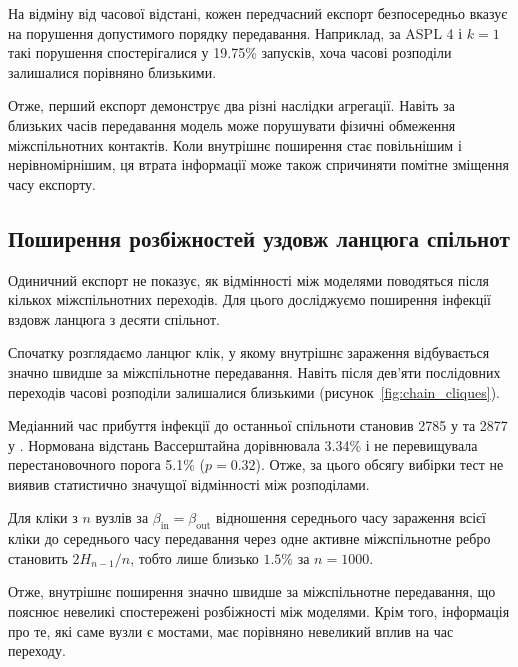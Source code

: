 На відміну від часової відстані,
кожен передчасний експорт безпосередньо
вказує на порушення допустимого порядку
передавання. Наприклад, за ASPL 4
і $k=1$ такі порушення спостерігалися
у 19.75\% запусків, хоча часові
розподіли залишалися порівняно близькими.

Отже, перший експорт демонструє
два різні наслідки агрегації.
Навіть за близьких часів передавання
модель може порушувати фізичні
обмеження міжспільнотних контактів.
Коли внутрішнє поширення стає повільнішим
і нерівномірнішим, ця втрата інформації
може також спричиняти помітне
зміщення часу експорту.


\subsection{Поширення розбіжностей
уздовж ланцюга спільнот}
\label{sec:res_chain_random}

Одиничний експорт не показує,
як відмінності між моделями поводяться
після кількох міжспільнотних переходів.
Для цього досліджуємо поширення інфекції
вздовж ланцюга з десяти спільнот.

Спочатку розглядаємо ланцюг клік,
у якому внутрішнє зараження відбувається
значно швидше за міжспільнотне передавання.
Навіть після дев'яти послідовних переходів
часові розподіли залишалися близькими
(рисунок~\ref{fig:chain_cliques}).

Медіанний час прибуття інфекції
до останньої спільноти становив
2785 у \Full{} та 2877 у \TS{}.
Нормована відстань Вассерштайна
дорівнювала 3.34\% і не перевищувала
перестановочного порога 5.1\%
($p=0.32$). Отже, за цього обсягу
вибірки тест не виявив статистично
значущої відмінності між розподілами.

Для кліки з $n$ вузлів за
$\beta_{\mathrm{in}}=\beta_{\mathrm{out}}$
відношення середнього часу зараження
всієї кліки до середнього часу
передавання через одне активне
міжспільнотне ребро становить
$2H_{n-1}/n$, тобто лише близько
$1.5\%$ за $n=1000$.

Отже, внутрішнє поширення значно
швидше за міжспільнотне передавання,
що пояснює невеликі спостережені
розбіжності між моделями. Крім того, інформація про те, які саме вузли є мостами, має порівняно невеликий вплив на час переходу.

